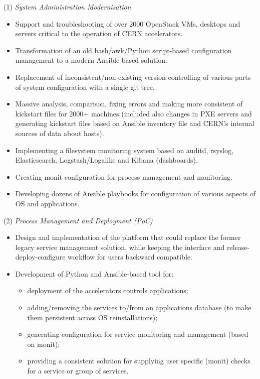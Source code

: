 \documentclass[$fontsize$, a4paper]{article}
\begin{document}
\vspace{10pt}
(1) \emph{System Administration Modernisation}
\begin{itemize}
  \item Support and troubleshooting of over 2000 OpenStack VMs, desktops and servers critical to the operation of CERN accelerators.
  \item Transformation of an old bash/awk/Python script-based configuration management to a modern Ansible-based solution.
  \item Replacement of inconsistent/non-existing version controlling of various parts of system configuration with a single git tree.
  \item Massive analysis, comparison, fixing errors and making more consistent of kickstart files for 2000+ machines (included also changes in PXE servers and generating kickstart files based on Ansible inventory file and CERN's internal sources of data about hosts).
  \item Implementing a filesystem monitoring system based on auditd, rsyslog, Elasticsearch, Logstash/Logalike and Kibana (dashboards).
  \item Creating monit configuration for process management and monitoring.
  \item Developing dozens of Ansible playbooks for configuration of various aspects of OS and applications.
\end{itemize}

\pagebreak
(2) \emph{Process Management and Deployment (PoC)}
\begin{itemize}
  \item Design and implementation of the platform that could replace the former legacy service management solution,
  while keeping the interface and release-deploy-configure workflow for users backward compatible.
  \item Development of Python and Ansible-based tool for:
  \begin{itemize}
    \item deployment of the accelerators controls applications;
    \item adding/removing the services to/from an applications database (to make them persistent across OS reinstallations);
    \item generating configuration for service monitoring and management (based on monit);
    \item providing a consistent solution for supplying user specific (monit) checks for a service or group of services.
  \end{itemize}
\end{itemize}
\end{document}
